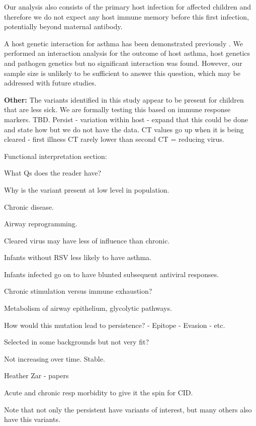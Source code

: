 \documentclass{article}
\begin{document}
Our analysis also consists of the primary host infection for affected children and therefore we do not expect any host immune memory before this first infection, potentially beyond maternal antibody.

A host genetic interaction for asthma has been demonstrated previously 
\cite{moffatt2010large}.
We performed an interaction analysis for the outcome of host asthma, 
host genetics and pathogen genetics 
but no significant interaction was found. 
However, our sample size is unlikely to be sufficient to answer this question, 
which may be addressed with future studies. 

\textbf{Other:}
The variants identified in this study appear to be present for children that are less sick.
We are formally testing this based on immune response markers. TBD.
Persist - variation within host - expand that this could be done and state how but we do not have the data. 
CT values go up when it is being cleared  - first illness CT rarely lower than second CT = reducing virus.

Functional interpretation section:
\begin{description}[noitemsep]
\item What Qs does the reader have?
\item Why is the variant present at low level in population. 
\item Chronic disease.
\item Airway reprogramming.
\item Cleared virus may have less of influence than chronic.
\item Infants without RSV less likely to have asthma.
\item Infants infected go on to have blunted subsequent antiviral responses.
\item Chronic stimulation versus immune exhaustion?
\item Metabolism of airway epithelium, glycolytic pathways.
\item How would this mutation lead to persistence? 
	- Epitope
	- Evasion
	- etc.
\item Selected in some backgrounds but not very fit?
\item Not increasing over time. Stable.
\item Heather Zar - papers
\item Acute and chronic resp morbidity to give it the spin for CID.
	\item Note that not only the persistent have variants of interest, but many others also have this variants. 
\end{description}
\end{document}
